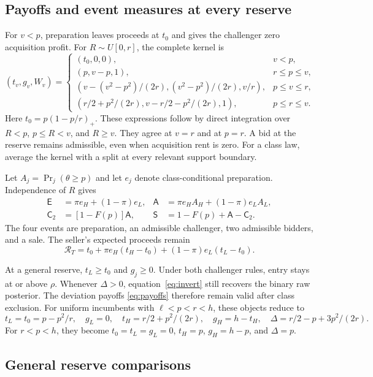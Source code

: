 \documentclass[12pt]{article}
\newcommand{\RR}{\mathcal R_T}
\begin{document}
\subsection{Payoffs and event measures at every reserve}
For $v<p$, preparation leaves proceeds at $t_0$ and gives the challenger zero acquisition profit.
For $R\sim U[0,r]$, the complete kernel is
\begin{equation}\label{eq:reserve-kernel}
 (t_v,g_v,W_v)=
 \begin{cases}
 (t_0,0,0),&v<p,\\
 (p,v-p,1),&r\le p\le v,\\
 (v-(v^2-p^2)/(2r),(v^2-p^2)/(2r),v/r),&p\le v\le r,\\
 (r/2+p^2/(2r),v-r/2-p^2/(2r),1),&p\le r\le v.
 \end{cases}
\end{equation}
Here $t_0=p(1-p/r)_+$.
These expressions follow by direct integration over $R<p$, $p\le R<v$, and $R\ge v$.
They agree at $v=r$ and at $p=r$.
A bid at the reserve remains admissible, even when acquisition rent is zero.
For a class law, average the kernel with a split at every relevant support boundary.

Let $A_j=\Pr_j(\theta\ge p)$ and let $e_j$ denote class-conditional preparation.
Independence of $R$ gives
\begin{align}\label{eq:events}
 \mathsf E&=\pi e_H+(1-\pi)e_L,&
 \mathsf A&=\pi e_HA_H+(1-\pi)e_LA_L,\\
 \mathsf C_2&=[1-F(p)]\mathsf A,&
 \mathsf S&=1-F(p)+\mathsf A-\mathsf C_2.\nonumber
\end{align}
The four events are preparation, an admissible challenger, two admissible bidders, and a sale.
The seller's expected proceeds remain
\[
 \RR=t_0+\pi e_H(t_H-t_0)+(1-\pi)e_L(t_L-t_0).
\]

At a general reserve, $t_L\ge t_0$ and $g_j\ge0$.
Under both challenger rules, entry stays at or above $\rho$.
Whenever $\Delta>0$, equation~\eqref{eq:invert} still recovers the binary raw posterior.
The deviation payoffs \eqref{eq:payoffs} therefore remain valid after class exclusion.
For uniform incumbents with $\ell<p<r<h$, these objects reduce to
\begin{equation}\label{eq:excluded}
 t_L=t_0=p-p^2/r,\quad g_L=0,\quad
 t_H=r/2+p^2/(2r),\quad g_H=h-t_H,\quad
 \Delta=r/2-p+3p^2/(2r).
\end{equation}
For $r<p<h$, they become $t_0=t_L=g_L=0$, $t_H=p$, $g_H=h-p$, and $\Delta=p$.

\subsection{General reserve comparisons}
\end{document}
